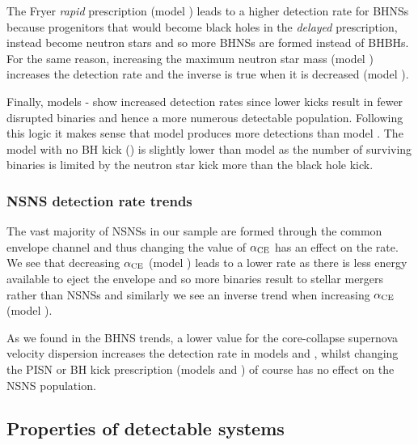 The Fryer \textit{rapid} prescription (model \modRapid{}) leads to a higher detection rate for BHNSs because progenitors that would become black holes in the \textit{delayed} prescription, instead become neutron stars and so more BHNSs are formed instead of BHBHs. For the same reason, increasing the maximum neutron star mass (model \modNSHigh{}) increases the detection rate and the inverse is true when it is decreased (model \modNSLow{}).

Finally, models \modSigLow{}-\modNoBH{} show increased detection rates since lower kicks result in fewer disrupted binaries and hence a more numerous detectable population. Following this logic it makes sense that model \modSigLower{} produces more detections than model \modSigLow{}. The model with no BH kick (\modNoBH{}) is slightly lower than model \modSigLower{} as the number of surviving binaries is limited by the neutron star kick more than the black hole kick.

\subsubsection{NSNS detection rate trends}\label{sec:NSNS_detection_trends}

The vast majority of NSNSs in our sample are formed through the common envelope channel and thus changing the value of $\alpha_{\rm CE}$ has an effect on the rate. We see that decreasing $\alpha_{\rm CE}$ (model \modAlphaLow) leads to a lower rate as there is less energy available to eject the envelope and so more binaries result to stellar mergers rather than NSNSs and similarly we see an inverse trend when increasing $\alpha_{\rm CE}$ (model \modAlphaHigh).

As we found in the BHNS trends, a lower value for the core-collapse supernova velocity dispersion increases the detection rate in models \modSigLow{} and \modSigLower{}, whilst changing the PISN or BH kick prescription (models \modNoPISN{} and \modNoBH{}) of course has no effect on the NSNS population.

\subsection{Properties of detectable systems}\label{sec:property_variations}
